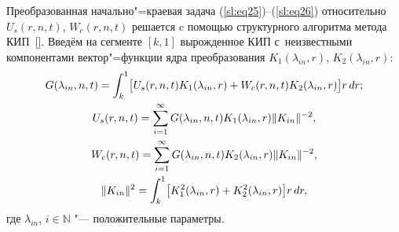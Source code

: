 Преобразованная начально"=краевая задача (\ref{sl:eq25})--(\ref{sl:eq26}) относительно \linebreak  $U_s (r, n, t)$, $W_c (r, n, t)$ решается c помощью
структурного алгоритма метода КИП~[]. 
Введём на сегменте $[k, 1]$ вырожденное КИП с~неизвестными компонентами вектор"=функции ядра  преобразования 
$K_1 (\lambda_{in} , r)$, $ K_2(\lambda_{in} , r)$: 
\begin{gather}
\label{sl:eq30}
G(\lambda_{in}, n, t)=\int_k^1 \bigl[ U_s (r, n, t) K_1 (\lambda_{in}, r)+W_c (r, n, t)K_2(\lambda_{in}, r)\bigr]r\,dr; \\
\notag
U_s (r, n, t)=\sum\limits_{i=1}^\infty G(\lambda _{in} , n, t) K_1 (\lambda_{in}, r) \| K_{in} \|^{-2} , 
\\
\label{sl:eq31}
W_c (r, n, t) =\sum\limits_{i=1}^\infty 
G(\lambda _{in} , n, t) K_2 (\lambda _{in} , r)\|K_{in}\|^{-2} , \\
\notag
\|K_{in}\|^2=\int_k^1 \bigl[K_1^2 (\lambda _{in}, r)+K_2^2 (\lambda_{in}, r)\bigr]r\,dr , 
\end{gather}
где $\lambda _{in}$, $i\in \mathbb N$ "--- положительные параметры.



